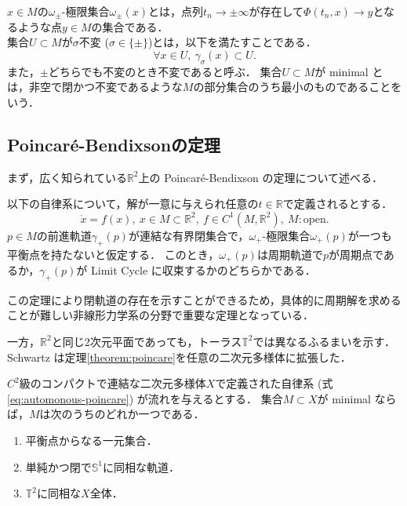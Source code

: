 \documentclass[../main]{subfiles}
\begin{document}
$x\in M$の$\omega_\pm$-極限集合$\omega_\pm(x)$とは，点列$t_n\to \pm\infty$が存在して$\Phi(t_n,x)\to y$となるような点$y\in M$の集合である．\\

集合$U\subset M$が$\sigma$不変 ($\sigma\in\{\pm\}$)とは，以下を満たすことである．
\begin{equation}
    \forall x\in U,\ \gamma_\sigma (x)\subset U.
\end{equation}
また，$\pm$どちらでも不変のとき不変であると呼ぶ．
集合$U\subset M$が minimal とは，非空で閉かつ不変であるような$M$の部分集合のうち最小のものであることをいう．
\subsection{Poincar\'{e}-Bendixsonの定理}
まず，広く知られている$\mathbb{R}^2$上の Poincar\'{e}-Bendixson の定理について述べる．
\begin{theorem}
    以下の自律系について，解が一意に与えられ任意の$t\in\mathbb{R}$で定義されるとする．
    \begin{equation}
        \dot{x}=f(x),\ x\in M\subset \mathbb{R}^2,\ f\in C^1(M,\mathbb{R}^2),\ M:\mathrm{open}.         \label{eq:automonous-poincare}
    \end{equation}
    $p\in M$の前進軌道$\gamma_+(p)$が連結な有界閉集合で，$\omega_+$-極限集合$\omega_+(p)$が一つも平衡点を持たないと仮定する．
    このとき，$\omega_+(p)$は周期軌道で$p$が周期点であるか，$\gamma_+(p)$が Limit Cycle に収束するかのどちらかである．
    \label{theorem:poincare}
\end{theorem}
この定理により閉軌道の存在を示すことができるため，具体的に周期解を求めることが難しい非線形力学系の分野で重要な定理となっている．

一方，$\mathbb{R}^2$と同じ2次元平面であっても，トーラス$\mathbb{T}^2$では異なるふるまいを示す．
Schwartz は定理\ref{theorem:poincare}を任意の二次元多様体に拡張した\cite{Schwartz1963ErrataAG}．
\begin{theorem}
    \label{thm:poiben-gen}
    $C^2$級のコンパクトで連結な二次元多様体$X$で定義された自律系 (式\eqref{eq:automonous-poincare}) が流れを与えるとする．
    集合$M\subset X$が minimal ならば，$M$は次のうちのどれか一つである．
    \begin{enumerate}
        \item 平衡点からなる一元集合．
        \item 単純かつ閉で$\mathbb{S}^1$に同相な軌道．
        \item $\mathbb{T}^2$に同相な$X$全体．
    \end{enumerate}
\end{theorem}
\end{document}
